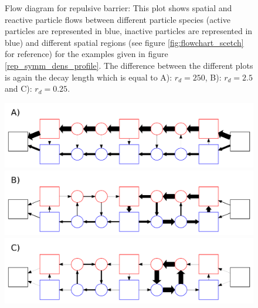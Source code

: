\begin{minipage}[t]{.372 \textwidth}
    \vspace{0.5 cm}
    \begin{figure}[H]
        \caption{Flow diagram for repulsive barrier: This plot shows spatial and reactive particle flows between different particle species (active particles are represented in blue, inactive particles are represented in blue) and different spatial regions (see figure \ref{fig:flowchart_scetch} for reference) for the examples given in figure \ref{rep_symm_dens_profile}. The difference between the different plots is again the decay length which is equal to \newline A): $r_d=250$, B): $r_d=2.5$ and \newline C): $r_d = 0.25$.
    \label{fig:flow_repulsive}}
    \end{figure}
\end{minipage}\hspace{0.02 \textwidth}\begin{minipage}[t]{.608 \textwidth}
    \begin{figure}[H]
        \includegraphics[width = 1 \textwidth]{plots/rep_flowchart0.pdf} 
        \includegraphics[width = 1 \textwidth]{plots/rep_flowchart1.pdf} 
        \includegraphics[width = 1 \textwidth]{plots/rep_flowchart2.pdf}
    \end{figure}
\end{minipage}
